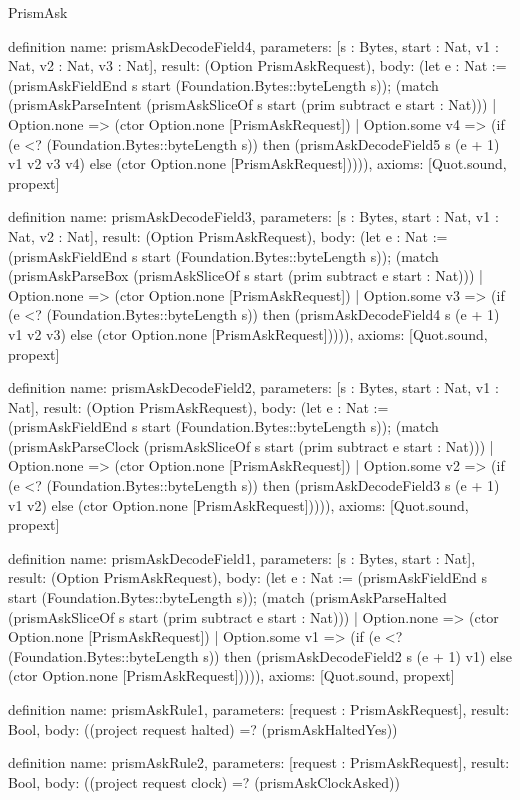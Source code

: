\begin{lexlean}{PrismAsk}
\begin{semanticmodule}
definition{
  name: prismAskDecodeField4,
  parameters: [s : Bytes, start : Nat, v1 : Nat, v2 : Nat, v3 : Nat],
  result: (Option PrismAskRequest),
  body: (let e : Nat := (prismAskFieldEnd s start (Foundation.Bytes::byteLength s)); (match (prismAskParseIntent (prismAskSliceOf s start (prim subtract e start : Nat)))
    | Option.none => (ctor Option.none [PrismAskRequest])
    | Option.some v4 => (if (e <? (Foundation.Bytes::byteLength s)) then (prismAskDecodeField5 s (e + 1) v1 v2 v3 v4) else (ctor Option.none [PrismAskRequest])))),
  axioms: [Quot.sound, propext]
}

definition{
  name: prismAskDecodeField3,
  parameters: [s : Bytes, start : Nat, v1 : Nat, v2 : Nat],
  result: (Option PrismAskRequest),
  body: (let e : Nat := (prismAskFieldEnd s start (Foundation.Bytes::byteLength s)); (match (prismAskParseBox (prismAskSliceOf s start (prim subtract e start : Nat)))
    | Option.none => (ctor Option.none [PrismAskRequest])
    | Option.some v3 => (if (e <? (Foundation.Bytes::byteLength s)) then (prismAskDecodeField4 s (e + 1) v1 v2 v3) else (ctor Option.none [PrismAskRequest])))),
  axioms: [Quot.sound, propext]
}

definition{
  name: prismAskDecodeField2,
  parameters: [s : Bytes, start : Nat, v1 : Nat],
  result: (Option PrismAskRequest),
  body: (let e : Nat := (prismAskFieldEnd s start (Foundation.Bytes::byteLength s)); (match (prismAskParseClock (prismAskSliceOf s start (prim subtract e start : Nat)))
    | Option.none => (ctor Option.none [PrismAskRequest])
    | Option.some v2 => (if (e <? (Foundation.Bytes::byteLength s)) then (prismAskDecodeField3 s (e + 1) v1 v2) else (ctor Option.none [PrismAskRequest])))),
  axioms: [Quot.sound, propext]
}

definition{
  name: prismAskDecodeField1,
  parameters: [s : Bytes, start : Nat],
  result: (Option PrismAskRequest),
  body: (let e : Nat := (prismAskFieldEnd s start (Foundation.Bytes::byteLength s)); (match (prismAskParseHalted (prismAskSliceOf s start (prim subtract e start : Nat)))
    | Option.none => (ctor Option.none [PrismAskRequest])
    | Option.some v1 => (if (e <? (Foundation.Bytes::byteLength s)) then (prismAskDecodeField2 s (e + 1) v1) else (ctor Option.none [PrismAskRequest])))),
  axioms: [Quot.sound, propext]
}

definition{
  name: prismAskRule1,
  parameters: [request : PrismAskRequest],
  result: Bool,
  body: ((project request halted) =? (prismAskHaltedYes))
}

definition{
  name: prismAskRule2,
  parameters: [request : PrismAskRequest],
  result: Bool,
  body: ((project request clock) =? (prismAskClockAsked))
}


\end{semanticmodule}
\end{lexlean}
